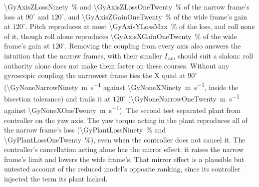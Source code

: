 \documentclass[11pt,a4paper]{article}
\begin{document}
\SI{\GyAxisZLossNinety}{\percent} and \SI{\GyAxisZLossOneTwenty}{\percent} of the
narrow frame's loss at $90^\circ$ and $120^\circ$, and
\SI{\GyAxisZGainOneTwenty}{\percent} of the wide frame's gain at $120^\circ$.
Pitch reproduces at most \SI{\GyAxisYLossMax}{\percent} of the loss, and roll none
of it, %
though roll alone reproduces \SI{\GyAxisXGainOneTwenty}{\percent} of the wide
frame's gain at $120^\circ$.
Removing the coupling from every axis also answers the intuition that the narrow
frames, with their smaller $I_{xx}$, should suit a slalom: roll authority alone
does not make them faster on these courses. Without any gyroscopic coupling the
narrowest frame ties the X quad at $90^\circ$
(\SI{\GyNoneNarrowNinety}{\metre\per\second} against \SI{\GyNoneXNinety}{\metre\per\second},
inside the bisection tolerance) and trails it at $120^\circ$
(\SI{\GyNoneNarrowOneTwenty}{\metre\per\second} against
\SI{\GyNoneXOneTwenty}{\metre\per\second}).
The second test separated plant from controller on the yaw axis. The yaw torque
acting in the plant reproduces all of the narrow frame's loss
(\SI{\GyPlantLossNinety}{\percent} and \SI{\GyPlantLossOneTwenty}{\percent}), even
when the controller does not cancel it. The controller's cancellation acting
alone has the mirror effect: it raises the narrow frame's limit and lowers the
wide frame's. That mirror effect is a plausible but untested account of the
reduced model's opposite ranking, since its controller injected the term its
plant lacked.

\begin{table}[htb]
  \centering
  \caption{Maximum completing speed (\si{\metre\per\second}) with the gyroscopic
  term kept only on the listed body axes, in the plant and in the controller's
  cancellation alike. ``All axes'' is the corrected model of
  Table~\ref{tab:corrected}; ``no axis'' omits the term consistently, as the
  reduced model's plant did but its controller did not. Three of the seven
  airframes---the narrowest, the X quad and the widest---on the two sharper
  courses; the $60^\circ$ course, whose spread across the family is
  \SI{\CorrSpreadSixty}{\percent}, was not flown.}
  \label{tab:axes}
  
\end{table}
\end{document}
